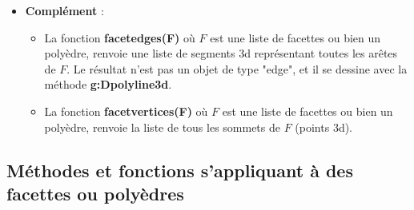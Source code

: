 \begin{itemize}
    \item \textbf{Complément} : 
        \begin{itemize}
            \item La fonction \textbf{facetedges(F)} où $F$ est une liste de facettes ou bien un polyèdre, renvoie une liste de segments 3d représentant toutes les arêtes de $F$. Le résultat n'est pas un objet de type "edge", et il se dessine avec la méthode \textbf{g:Dpolyline3d}.
            \item La fonction \textbf{facetvertices(F)} où $F$ est une liste de facettes ou bien un polyèdre, renvoie la liste de tous les sommets de $F$ (points 3d).
        \end{itemize}
\end{itemize}

\subsection{Méthodes et fonctions s'appliquant à des facettes ou polyèdres}

